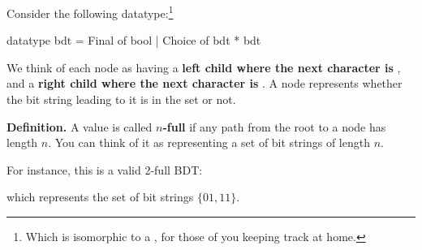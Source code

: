 \documentclass[addpoints,12pt, answers]{exam}
\begin{document}
\begin{questions}
Consider the following datatype:\footnote{Which is isomorphic to a , for
those of you keeping track at home.}
\begin{codeblock}
  datatype bdt =
      Final of bool
    | Choice of bdt * bdt
\end{codeblock}

We think of each  node as having a \textbf{left child where the next character
is }, and a \textbf{right child where the next character is }. A
 node represents whether the bit string leading to it is
in the set or not.

\textbf{Definition.} A value  is called \textbf{$n$-full} if
any path from the root to a  node has length $n$. You can think of
it as representing a set of bit strings of length $n$.

For instance, this is a valid 2-full BDT:

\begin{center}
\end{center}

which represents the set of bit strings $\{ 01, 11 \}$.

\newpage

\end{questions}
\end{document}
